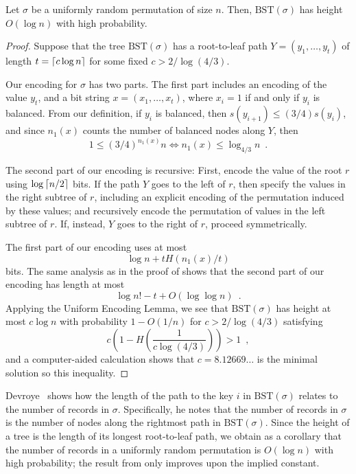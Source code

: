 \documentclass{patmorin}
\begin{document}
\begin{thm}
  Let $\sigma$ be a uniformly random permutation of size $n$. Then,
  $\text{BST}(\sigma)$ has height $O(\log n)$ with high probability.
\end{thm}
\begin{proof}
  Suppose that the tree $\text{BST}(\sigma)$ has a root-to-leaf path
  $Y = (y_1, \ldots, y_t)$ of length $t = {\lceil c \log n \rceil}$ for some
  fixed $c > 2/\log (4/3)$.

  Our encoding for $\sigma$ has two parts. The first part includes an
  encoding of the value $y_t$, and a bit string
  $x = (x_1, \ldots, x_t)$, where $x_i = 1$ if and only if $y_i$ is
  balanced. From our definition, if $y_i$ is balanced, then
  $s(y_{i + 1}) \leq (3/4) s(y_i)$, and since $n_1(x)$ counts the
  number of balanced nodes along $Y$, then
  \[
    1 \leq (3/4)^{n_1(x)} n \iff n_1(x) \leq \log_{4/3} n \enspace .
  \]

  The second part of our encoding is recursive: First, encode the
  value of the root $r$ using $\log {\lceil n/2 \rceil}$ bits. If the
  path $Y$ goes to the left of $r$, then specify the values in the
  right subtree of $r$, including an explicit encoding of the
  permutation induced by these values; and recursively encode the
  permutation of values in the left subtree of $r$. If, instead, $Y$
  goes to the right of $r$, proceed symmetrically.
 
  The first part of our encoding uses at most
  \[
    \log n + t H(n_1(x)/t)
  \]
  bits. The same analysis as in the proof of  shows that
  the second part of our encoding has length at most
  \[
    \log n! - t + O(\log \log n) \enspace .
  \]
  Applying the Uniform Encoding Lemma, we see that
  $\text{BST}(\sigma)$ has height at most $c \log n$ with probability
  $1 - O(1/n)$ for $c > 2/\log (4/3)$ satisfying
  \[
    c \left(1 - H\left(\frac{1}{c \log (4/3)}\right)\right) > 1 \enspace ,
  \]
  and a computer-aided calculation shows that $c = 8.12669\dots$ is the
  minimal solution so this inequality.
\end{proof}

\begin{rem}
  Devroye~\cite{devroye:records} shows how the length of the path to
  the key $i$ in $\text{BST}(\sigma)$ relates to the number of records
  in $\sigma$. Specifically, he notes that the number of records in
  $\sigma$ is the number of nodes along the rightmost path in
  $\text{BST}(\sigma)$. Since the height of a tree is the length of
  its longest root-to-leaf path, we obtain as a corollary that the
  number of records in a uniformly random permutation is $O(\log n)$
  with high probability; the result from  only
  improves upon the implied constant.
\end{rem}
\end{document}
